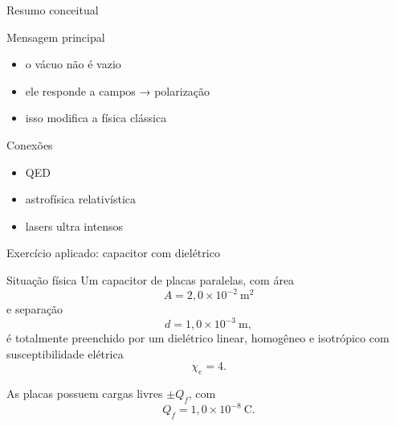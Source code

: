 \documentclass[aspectratio=169]{beamer}
\begin{document}

\begin{frame}{Resumo conceitual}

\begin{alertblock}{Mensagem principal}
\begin{itemize}
\item o vácuo não é vazio
\item ele responde a campos → polarização
\item isso modifica a física clássica
\end{itemize}
\end{alertblock}

\pause

\begin{block}{Conexões}
\begin{itemize}
\item QED
\item astrofísica relativística
\item lasers ultra intensos
\end{itemize}
\end{block}



\end{frame}



\begin{frame}{Exercício aplicado: capacitor com dielétrico}

\begin{block}{Situação física}
Um capacitor de placas paralelas, com área
\[
A = 2,0\times 10^{-2}\ \text{m}^2
\]
e separação
\[
d = 1,0\times 10^{-3}\ \text{m},
\]
é totalmente preenchido por um dielétrico linear, homogêneo e isotrópico com susceptibilidade elétrica
\[
\chi_e = 4.
\]

As placas possuem cargas livres \(\pm Q_f\), com
\[
Q_f = 1,0\times 10^{-8}\ \text{C}.
\]
\end{block}

\end{frame}

\end{document}
